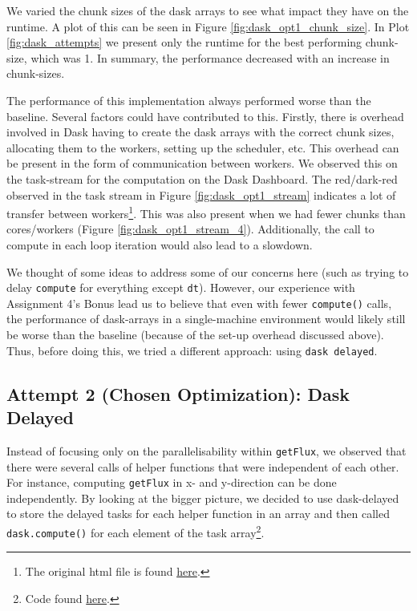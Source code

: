 \documentclass[a4paper,10pt]{article}
\begin{document}
We varied the chunk sizes of the dask arrays to see what impact they have on the runtime.
A plot of this can be seen in Figure \ref{fig:dask_opt1_chunk_size}.
In Plot \ref{fig:dask_attempts} we present only the runtime for the best performing chunk-size, which was 1.
In summary, the performance decreased with an increase in chunk-sizes.

The performance of this implementation always performed worse than the baseline.
Several factors could have contributed to this.
Firstly, there is overhead involved in Dask having to create the dask arrays with the correct chunk sizes, allocating them to the workers, setting up the scheduler, etc.
This overhead can be present in the form of communication between workers.
We observed this on the task-stream for the computation on the Dask Dashboard.
The red/dark-red observed in the task stream in Figure \ref{fig:dask_opt1_stream} indicates a lot of transfer between workers\footnote{The original html file is found \href{https://docs.dask.org/en/stable/dashboard.html\#task-stream}{here}.}.
This was also present when we had fewer chunks than cores/workers (Figure \ref{fig:dask_opt1_stream_4}).
Additionally, the call to compute in each loop iteration would also lead to a slowdown.

We thought of some ideas to address some of our concerns here (such as trying to delay \verb|compute| for everything except \verb|dt|).
However, our experience with Assignment 4's Bonus lead us to believe that even with fewer \verb|compute()| calls, the performance of dask-arrays in a single-machine environment would likely still be worse than the baseline (because of the set-up overhead discussed above).
Thus, before doing this, we tried a different approach: using \verb|dask delayed|.

\subsection{Attempt 2 (Chosen Optimization): Dask Delayed}
Instead of focusing only on the parallelisability within \verb|getFlux|, we observed that there were several calls of helper functions that were independent of each other.
For instance, computing \verb|getFlux| in x- and y-direction can be done independently.
By looking at the bigger picture, we decided to use dask-delayed to store the delayed tasks for each helper function in an array and then called \verb|dask.compute()| for each element of the task array\footnote{Code found \href{https://github.com/paulmyr/DD2358-HPC25/blob/master/10_project_rishi_paul/code/dask/finitevolume_dask_opt2.py}{here}.}.
\end{document}
